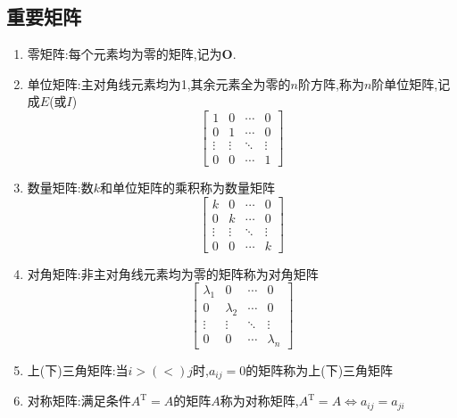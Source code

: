 \documentclass[8pt a4paper,oneside,UTF8]{ctexbook}
\begin{document}
\begin{sloppypar}
    \subsection{重要矩阵}
    \begin{enumerate}
        \item 零矩阵:每个元素均为零的矩阵,记为$\boldsymbol{O}$.
        \item 单位矩阵:主对角线元素均为1,其余元素全为零的$n$阶方阵,称为$n$阶单位矩阵,记成$E$(或$I$)
              $$
                  \begin{bmatrix}
                      1      & 0      & \cdots & 0      \\
                      0      & 1      & \cdots & 0      \\
                      \vdots & \vdots & \ddots & \vdots \\
                      0      & 0      & \cdots & 1
                  \end{bmatrix}
              $$
        \item 数量矩阵:数$k$和单位矩阵的乘积称为数量矩阵
              $$
                  \begin{bmatrix}
                      k      & 0      & \cdots & 0      \\
                      0      & k      & \cdots & 0      \\
                      \vdots & \vdots & \ddots & \vdots \\
                      0      & 0      & \cdots & k
                  \end{bmatrix}
              $$
        \item 对角矩阵:非主对角线元素均为零的矩阵称为对角矩阵
              $$
                  \begin{bmatrix}
                      \lambda_1 & 0         & \cdots & 0         \\
                      0         & \lambda_2 & \cdots & 0         \\
                      \vdots    & \vdots    & \ddots & \vdots    \\
                      0         & 0         & \cdots & \lambda_n
                  \end{bmatrix}
              $$
        \item 上(下)三角矩阵:当$i>(<)j$时,$a_{ij}=0$的矩阵称为上(下)三角矩阵
        \item 对称矩阵:满足条件$A^{\mathrm{T}}=A$的矩阵$A$称为对称矩阵,$A^{\mathrm{T}}=A\Leftrightarrow a_{ij}=a_{ji}$
              $$
$$
\end{enumerate}
\end{sloppypar}
\end{document}
